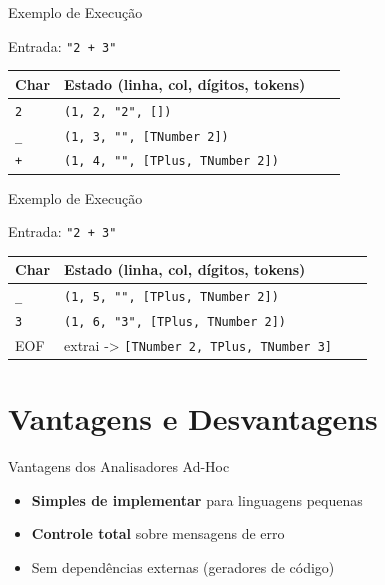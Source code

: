 \begin{frame}[fragile]{Exemplo de Execução}

    Entrada: \texttt{"2 + 3"}

    \begin{table}
        \begin{tabular}{l l l l}
            \hline
            Char & Estado (linha, col, dígitos, tokens) \\
            \hline
            \texttt{2} &
            \texttt{(1, 2, "2", [])} \\
            \texttt{\_} &
            \texttt{(1, 3, "", [TNumber 2])} \\
            \texttt{+} &
            \texttt{(1, 4, "", [TPlus, TNumber 2])} \\
            \hline
        \end{tabular}
    \end{table}
\end{frame}

\begin{frame}[fragile]{Exemplo de Execução}

    Entrada: \texttt{"2 + 3"}

    \begin{table}
        \begin{tabular}{l l l l}
            \hline
            Char & Estado (linha, col, dígitos, tokens) \\
            \hline
            \texttt{\_} &
            \texttt{(1, 5, "", [TPlus, TNumber 2])} \\
            \texttt{3} &
            \texttt{(1, 6, "3", [TPlus, TNumber 2])} \\
            EOF & extrai ->
            \texttt{[TNumber 2, TPlus, TNumber 3]} \\
            \hline
        \end{tabular}
    \end{table}
\end{frame}


\section{Vantagens e Desvantagens}\label{vantagens-e-desvantagens}

\begin{frame}{Vantagens dos Analisadores Ad-Hoc}

    \begin{itemize}

        \item
        \textbf{Simples de implementar} para linguagens pequenas
        \item
        \textbf{Controle total} sobre mensagens de erro
        \item
        Sem dependências externas (geradores de código)
    \end{itemize}
\end{frame}

